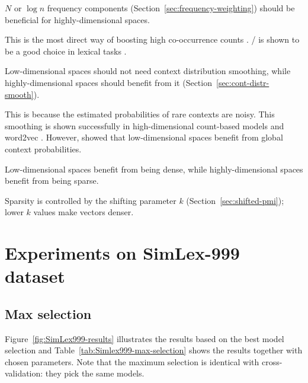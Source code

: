 \begin{hyp}
  \label{hyp:freq}
 $N$ or $\log n$ frequency components (Section~\ref{sec:frequency-weighting}) should be beneficial for highly-dimensional spaces.
\end{hyp}

This is the most direct way of boosting high co-occurrence counts \cite{Evert05}. \NPMI/ is shown to be a good choice in lexical tasks \cite{Bruni:2012:DST:2390524.2390544}.

\begin{hyp}
  \label{hyp:cds}
  Low-dimensional spaces should not need context distribution smoothing, while highly-dimensional spaces should benefit from it (Section~\ref{sec:cont-distr-smooth}).
\end{hyp}

This is because the estimated probabilities of rare contexts are noisy. This smoothing is shown successfully in high-dimensional count-based models \cite{TACL570} and word2vec \cite{mikolov2013efficient}. However,  showed that low-dimensional spaces benefit from global context probabilities.

\begin{hyp}
  \label{hyp:neg}
  Low-dimensional spaces benefit from being dense, while highly-dimensional spaces benefit from being sparse.
\end{hyp}

Sparsity is controlled by the shifting parameter $k$ (Section~\ref{sec:shifted-pmi}); lower $k$ values make vectors denser.

\section{Experiments on SimLex-999 dataset}
\label{sec:simlex-999}



\subsection{Max selection}
\label{sec:max-selection-simlex}


%
%
%

Figure~\ref{fig:SimLex999-results} illustrates the results based on the best model selection and Table~\ref{tab:Simlex999-max-selection} shows the results together with chosen parameters. Note that the maximum selection is identical with cross-validation: they pick the same models.

